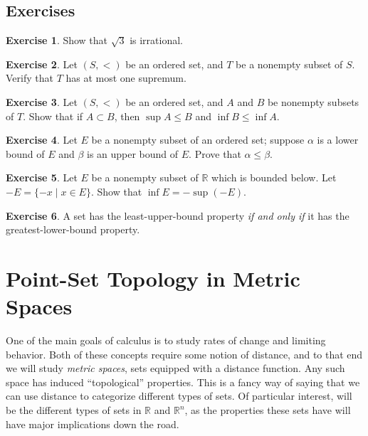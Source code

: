\documentclass{article}
\newcommand{\R}{\mathbb{R}}
\theoremstyle{definition}
\newtheorem{ex}{Exercise}[section]
\begin{document}
	\subsection{Exercises}
	\begin{ex}
		Show that $ \sqrt{3} $ is irrational.
	\end{ex}
	\begin{ex}
		Let $ (S,<) $ be an ordered set, and $ T $ be a nonempty subset of $ S $. Verify that $ T $ has at most one supremum.
	\end{ex}
	\begin{ex}
		Let $ (S,<) $ be an ordered set,  and $ A $ and $ B $ be nonempty subsets of $ T $. Show that if $ A\subset B $, then $ \sup A\le B $ and $ \inf B\le\inf A $.
	\end{ex}
	\begin{ex}
		Let $ E $ be a nonempty subset of an ordered set; suppose $ \alpha $ is a lower bound of $ E $ and $ \beta $ is an upper bound of $ E $. Prove that $ \alpha\le\beta $. 
	\end{ex}
	\begin{ex}
		Let $ E $ be a nonempty subset of $ \R $ which is bounded below. Let $ -E=\{-x\mid x\in E\} $. Show that $ \inf E=-\sup(-E) $. 
	\end{ex}
	\begin{ex}
		A set has the least-upper-bound property \textit{if and only if} it has the greatest-lower-bound property. 
	\end{ex}
	\newpage
	
	\section{Point-Set Topology in Metric Spaces}
	One of the main goals of calculus is to study rates of change and limiting behavior. Both of these concepts require some notion of distance, and to that end we will study \textit{metric spaces}, sets equipped with a distance function. Any such space has induced ``topological'' properties. This is a fancy way of saying that we can use distance to categorize different types of sets. Of particular interest, will be the different types of sets in $ \R $ and $ \R^n $, as the properties these sets have will have major implications down the road.  
\end{document}
